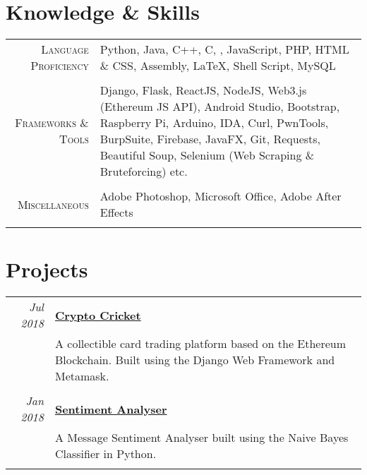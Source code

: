\documentclass[a4paper,10pt]{article}
\begin{document}
\section{Knowledge \& Skills}
\begin{tabular}{r|p{12.5cm}}
 \textsc{Language Proficiency} & Python, Java, C++, C, , JavaScript, PHP, HTML \& CSS, Assembly, LaTeX, Shell Script, MySQL\\\multicolumn{1}{c}{}\\
 \textsc{Frameworks \& Tools} & Django, Flask, ReactJS, NodeJS, Web3.js (Ethereum JS API), Android Studio, Bootstrap, Raspberry Pi, Arduino, IDA, Curl, PwnTools, BurpSuite, Firebase, JavaFX, Git, Requests, Beautiful Soup, Selenium (Web Scraping \& Bruteforcing) etc.\\\multicolumn{1}{c}{}\\
 \textsc{Miscellaneous} & Adobe Photoshop, Microsoft Office, Adobe After Effects\\\multicolumn{1}{c}{}
\end{tabular}

\section{Projects}
\begin{tabular}{r|p{14.5cm}}
 \emph{Jul 2018} & \href{http://cricket4crypto.com/}{\textbf{Crypto Cricket}} \\&\normalsize{A collectible card trading platform based on the Ethereum Blockchain. Built using the Django Web Framework and Metamask.}\\\multicolumn{2}{c}{} \\
 \emph{Jan 2018} & \href{https://sentiment-analyser.yashitm.tech}{\textbf{Sentiment Analyser}} \\&\normalsize{A Message Sentiment Analyser built using the Naive Bayes Classifier in Python.}\\\multicolumn{2}{c}{} \\
\end{tabular}
 
 \newpage
 
\end{document}
